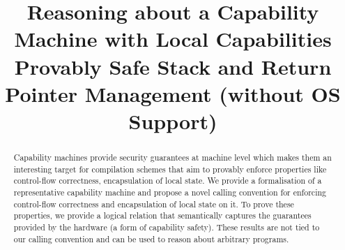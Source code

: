 \documentclass[compsoc,conference,letterpaper,fleqn]{IEEEtran}
\begin{document}
\setlength{\mathindent}{.2cm}

\title{Reasoning about a Capability Machine with Local Capabilities\\
 Provably Safe Stack and Return Pointer Management (without OS Support)}


\author{}
\maketitle

\begin{abstract}  
  Capability machines provide security guarantees at machine level which makes
  them an interesting target for compilation schemes that aim to provably
  enforce properties like control-flow correctness, encapsulation of local
  state. We provide a formalisation of a representative capability machine and
  propose a novel calling convention for enforcing control-flow correctness and
  encapsulation of local state on it. To prove these properties, we provide a
  logical relation that semantically captures the guarantees provided by the
  hardware (a form of capability safety). These results are not tied to our
  calling convention and can be used to reason about arbitrary programs.
\end{abstract}




\end{document}
